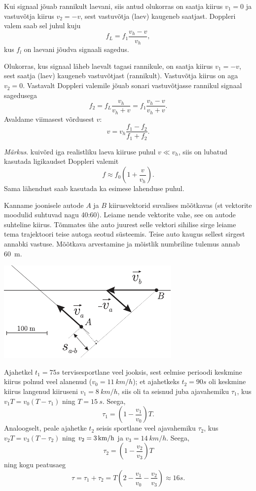 \documentclass[10pt]{article}
\begin{document}
{Kui signaal jõuab rannikult laevani, siis antud olukorras on saatja kiirus $v_1 = 0$ ja vastuvõtja kiirus $v_2 = -v$, sest vastuvõtja (laev) kaugeneb saatjast. Doppleri valem saab sel juhul kuju
\[
f_L = f_1 \frac{v_h-v}{v_h}, 
\]
kus $f_l$ on laevani jõudva signaali sagedus.

Olukorras, kus signaal läheb laevalt tagasi rannikule, on saatja kiirus $v_1 = -v$, sest saatja (laev) kaugeneb vastuvõtjast (rannikult). Vastuvõtja kiirus on aga $v_2 = 0$. Vastavalt Doppleri valemile jõuab sonari vastuvõtjasse rannikul signaal sagedusega
\[
f_2 = f_L \frac{v_h}{v_h+v} = f_1 \frac{v_h-v}{v_h+v}. 
\]
Avaldame viimasest võrdusest $v$:
\[
v = v_h \frac{f_1-f_2}{f_1+f_2}. 
\]

\emph{Märkus}. kuivõrd iga realistliku laeva kiiruse puhul $v \ll v_h$, siis on lubatud
kasutada ligikaudset Doppleri valemit
\[
f \approx f_0 \left(1+\frac{v}{v_h}\right).
\]
Sama lähendust saab kasutada ka esimese lahenduse puhul.
\probend
\bigskip


\solu
Kanname joonisele autode $A$ ja $B$ kiirusvektorid suvalises mõõtkavas (st vektorite moodulid suhtuvad nagu 40:60). Leiame nende vektorite vahe, see on autode suhteline kiirus. Tõmmates ühe auto juurest selle vektori sihilise sirge leiame tema trajektoori teise autoga seotud süsteemis. Teise auto kaugus sellest sirgest annabki vastuse. Mõõtkava arvestamine ja mõistlik numbriline tulemus annab \SI{60}{m}.
\begin{center}
	\includegraphics[width=0.7\linewidth]{2008-v2g-02-lah}
\end{center}
\probend
\bigskip


\solu
Ajahetkel $t_1=\SI{75}s$ tervisesportlane veel jooksis, sest eelmise perioodi keskmine kiirus polnud veel alanenud ($v_0=\SI{11}{km/h}$);
et ajahetkeks $t_2=\SI {90}s$ oli keskmine kiirus langenud kiiruseni $v_1=\SI{8}{km/h}$, siis oli ta seisnud juba ajavahemiku
$\tau_1$, kus $v_1 T= v_0 (T-\tau_1)$ ning $T=\SI{15}{s}$. Seega, 
\[
\tau_1=\left(1-\frac{v_1}{v_0}\right)T.
\]
Analoogselt, peale ajahetke $t_2$ seisis
sportlane veel ajavahemiku $\tau_2$, kus $v_2 T= v_3 (T-\tau_2)$ ning $v_2=\SI 3{km/h}$ ja $v_3=\SI{14}{km/h}$. Seega, 
\[
\tau_2=\left(1-\frac{v_2}{v_3}\right)T
\]
ning kogu peatusaeg
\[
\tau=\tau_1+\tau_2=T\left(2-\frac{v_1}{v_0}- \frac{v_2}{v_3}\right)\approx \SI{16}s.
\]
\probend
\bigskip

}
\end{document}
